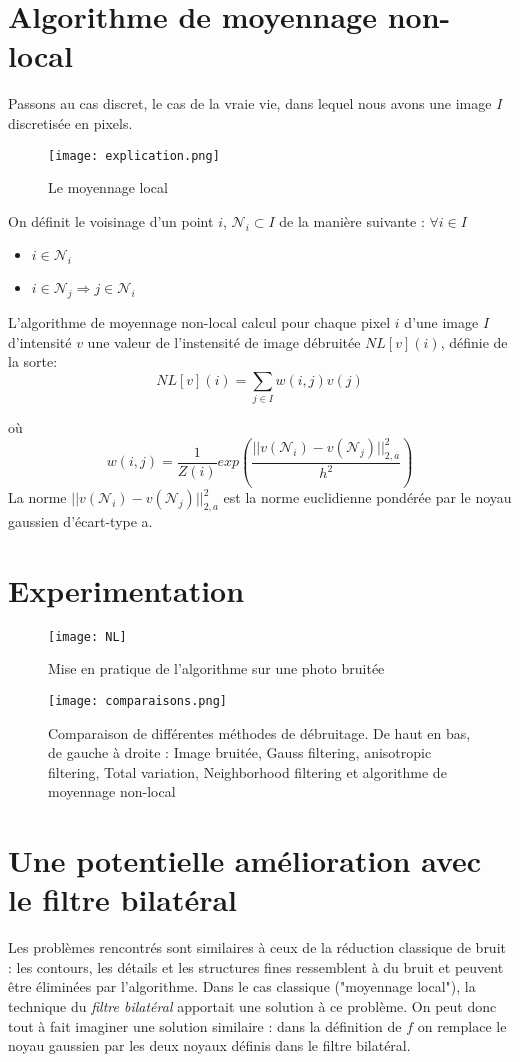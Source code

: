 \documentclass{article}
\begin{document}
\section*{Algorithme de moyennage non-local}
Passons au cas discret, le cas de la vraie vie, dans lequel nous avons une image $I$ discretisée en pixels.\\
\begin{figure}[h!]
    \centering
    \texttt{[image: explication.png]}
    \caption{Le moyennage local}
\end{figure}
\newpage
On définit le voisinage d'un point $i$, $\mathcal{N}_i \subset I$ de la manière suivante : $\forall i \in I  $
\begin{itemize}
    \item $i \in \mathcal{N}_i$
    \item $i \in \mathcal{N}_j\Rightarrow j \in \mathcal{N}_i$
\end{itemize}
L'algorithme de moyennage non-local calcul pour chaque pixel $i$ d'une image $I$ d'intensité $v$ une valeur de l'instensité de image débruitée $NL[v](i)$, définie de la sorte:
$$NL[v](i) = \sum_{j \in I} w(i,j)v(j)$$

où $$w(i,j) = \frac{1}{Z(i)}exp(\frac{||v(\mathcal{N}_i)-v(\mathcal{N}_{j})||_{2,a}^{2}}{h^{2}})$$
La norme $||v(\mathcal{N}_{i})-v(\mathcal{N}_j)||_{2,a}^{2}$ est la norme euclidienne pondérée par le noyau gaussien d'écart-type a.



\section*{Experimentation}

\begin{figure}[ht!]
    \centering
    \texttt{[image: NL]}
    \caption{Mise en pratique de l'algorithme sur une photo bruitée}
\end{figure}

\begin{figure}[ht!]
    \centering
    \texttt{[image: comparaisons.png]}
    \caption{Comparaison de différentes méthodes de débruitage. De haut en bas, de gauche à droite : Image bruitée, Gauss filtering, anisotropic filtering, Total variation, Neighborhood filtering et algorithme de moyennage non-local}
\end{figure}

\section*{Une potentielle amélioration avec le filtre bilatéral}
Les problèmes rencontrés sont similaires à ceux de la réduction classique de bruit : les contours, les détails et les structures fines ressemblent à du bruit et peuvent être éliminées par l'algorithme. Dans le cas classique ("moyennage local"), la technique du \textit{filtre bilatéral} apportait une solution à ce problème. On peut donc tout à fait imaginer une solution similaire : dans la définition de $f$ on remplace le noyau gaussien par les deux noyaux définis dans le filtre bilatéral.  
\end{document}
